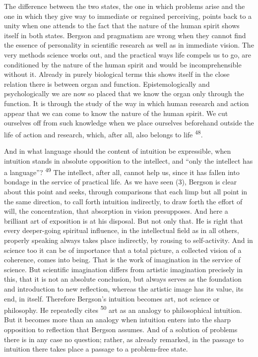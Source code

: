 \documentclass[12pt,a4paper,openany]{book}
\newcommand{\opage}[1]{\marginnote{\footnotesize\textit{[#1]}}}
\newcommand{\nm}[1]{\unskip\textsuperscript{#1}}
\begin{document}
The difference between the two states, the one in which problems arise and the one in which they give way to immediate or regained perceiving, points back to a unity when one attends to the fact that the nature of the human spirit shows itself in both states. Bergson and pragmatism are wrong when they cannot find the essence of personality in scientific research as well as in immediate vision. The very methods science works out, and the practical ways life compels us to go, are conditioned by the nature of the human spirit and would be incomprehensible without it. Already in purely biological terms this shows itself in the close relation there is between organ and function. Epistemologically and psychologically we are now so placed that we know the organ only through the function. It is through the study of the way in which human research and action appear that we can come to know the nature of the human spirit. We cut ourselves off from such
\opage{59}knowledge when we place ourselves beforehand outside the life of action and research, which, after all, also belongs to life \nm{48}.

And in what language should the content of intuition be expressible, when intuition stands in absolute opposition to the intellect, and ``only the intellect has a language''? \nm{49} The intellect, after all, cannot help us, since it has fallen into bondage in the service of practical life. As we have seen (3), Bergson is clear about this point and seeks, through comparisons that each limp but all point in the same direction, to call forth intuition indirectly, to draw forth the effort of will, the concentration, that absorption in vision presupposes. And here a brilliant art of exposition is at his disposal. But not only that. He is right that every deeper-going spiritual influence, in the intellectual field as in all others, properly speaking always takes place indirectly, by rousing to self-activity. And in science too it can be of importance that a total picture, a collected vision of a coherence, comes into being. That is the work of imagination in the service of science. But scientific imagination differs from artistic imagination precisely in this, that it is not an absolute conclusion, but always serves as the foundation and introduction to new reflection, whereas the artistic image has its value, its end, in itself. Therefore Bergson's intuition becomes art, not science or philosophy. He repeatedly cites \nm{50} art as an analogy to philosophical intuition. But it becomes more than an analogy when intuition enters into the sharp opposition to reflection that Bergson assumes. And of a solution of problems there is in any case no question; rather, as already remarked, in the passage to intuition there takes place a passage to a problem-free state.
\end{document}
